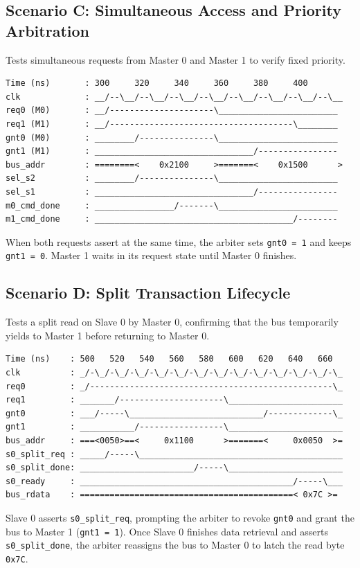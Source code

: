 \documentclass[11pt,a4paper]{article}
\begin{document}
\subsection{Scenario C: Simultaneous Access and Priority Arbitration}
Tests simultaneous requests from Master 0 and Master 1 to verify fixed priority.
\begin{lstlisting}[numbers=none, frame=none]
Time (ns)       : 300     320     340     360     380     400
clk             : __/--\__/--\__/--\__/--\__/--\__/--\__/--\__/--\__
req0 (M0)       : __/---------------------\________________________
req1 (M1)       : __/-------------------------------------\________
gnt0 (M0)       : ________/---------------\________________________
gnt1 (M1)       : ________________________________/----------------
bus_addr        : ========<    0x2100     >=======<    0x1500      >
sel_s2          : ________/---------------\________________________
sel_s1          : ________________________________/----------------
m0_cmd_done     : ________________/-------\________________________
m1_cmd_done     : ________________________________________/--------
\end{lstlisting}
When both requests assert at the same time, the arbiter sets \texttt{gnt0 = 1} and keeps \texttt{gnt1 = 0}. Master 1 waits in its request state until Master 0 finishes.

\subsection{Scenario D: Split Transaction Lifecycle}
Tests a split read on Slave 0 by Master 0, confirming that the bus temporarily yields to Master 1 before returning to Master 0.
\begin{lstlisting}[numbers=none, frame=none]
Time (ns)    : 500   520   540   560   580   600   620   640   660
clk          : _/-\_/-\_/-\_/-\_/-\_/-\_/-\_/-\_/-\_/-\_/-\_/-\_/-\_
req0         : _/-------------------------------------------------\_
req1         : _______/---------------------\_______________________
gnt0         : ___/-----\___________________________/-------------\_
gnt1         : ___________/-----------------\_______________________
bus_addr     : ===<0050>==<     0x1100      >=======<     0x0050  >=
s0_split_req : _____/-----\_________________________________________
s0_split_done: _______________________/-----\_______________________
s0_ready     : ___________________________________________/-----\___
bus_rdata    : ===========================================< 0x7C >=
\end{lstlisting}
Slave 0 asserts \texttt{s0\_split\_req}, prompting the arbiter to revoke \texttt{gnt0} and grant the bus to Master 1 (\texttt{gnt1 = 1}). Once Slave 0 finishes data retrieval and asserts \texttt{s0\_split\_done}, the arbiter reassigns the bus to Master 0 to latch the read byte \texttt{0x7C}.
\end{document}
